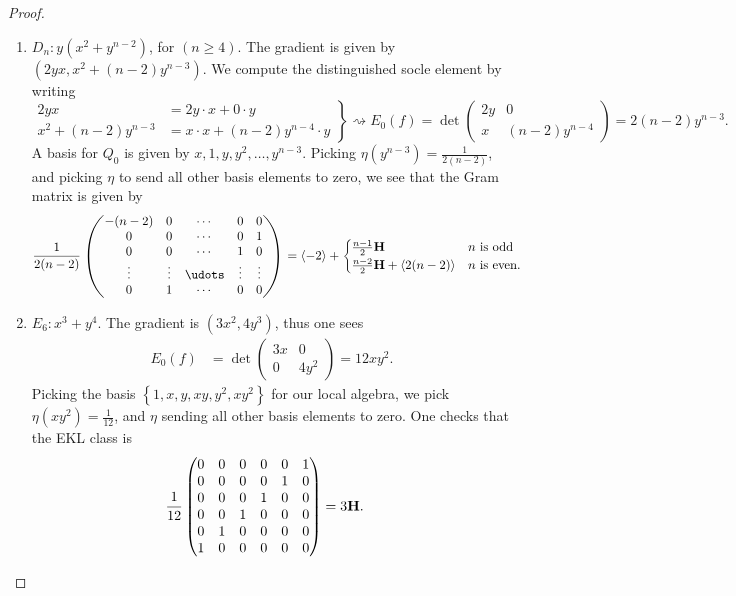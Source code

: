\documentclass[english]{article}
\begin{document}
\begin{proof}
\begin{enumerate}
    \item $D_n: y(x^2 + y^{n-2})$, for $(n\geq 4)$. The gradient is given by $(2yx, x^2 + (n-2)y^{n-3})$. We compute the distinguished socle element by writing
    \[ \left.\begin{aligned}
        2yx &= 2y \cdot x + 0\cdot y \\
        x^2 + (n-2)y^{n-3} &= x\cdot x + (n-2)y^{n-4}\cdot y
    \end{aligned} \right\}  \rightsquigarrow E_0(f) = \det \begin{pmatrix} 2y & 0 \\ x & (n-2)y^{n-4} \end{pmatrix}  = 2(n-2) y^{n-3}.
    \]    
    A basis for $Q_0$ is given by $x, 1, y, y^2, \ldots, y^{n-3}$. Picking $\eta(y^{n-3}) = \frac{1}{2(n-2)}$, and picking $\eta$ to send all other basis elements to zero, we see that the Gram matrix is given by
    \begin{align*}
        \frac{1}{2(n-2)}\begin{pmatrix} -(n-2) & 0 & \cdots & 0 & 0 \\
        0 & 0 & \cdots & 0 & 1 \\
        0 & 0 & \cdots & 1 & 0 \\
        \vdots & \vdots & \udots & \vdots & \vdots \\
        0 & 1 & \cdots & 0 & 0 \end{pmatrix} &= \left\langle -2 \right\rangle + \begin{cases} \frac{n-1}{2}\H & n\text{ is odd}\\ \frac{n-2}{2}\H + \left\langle 2(n-2) \right\rangle & n\text{ is even}. \end{cases}
    \end{align*}
    
    \item $E_6: x^3 + y^4$. The gradient is $(3x^2,4y^3)$, thus one sees
    \begin{align*}
        E_0(f) &= \det \begin{pmatrix} 3x & 0 \\ 0 & 4y^2 \end{pmatrix} = 12xy^2.
    \end{align*}
    Picking the basis $\left\{1,x,y, xy, y^2, xy^2\right\}$ for our local algebra, we pick $\eta(xy^2) = \frac{1}{12}$, and $\eta$ sending all other basis elements to zero. One checks that the EKL class is
    \begin{align*}
        \frac{1}{12} \begin{pmatrix}
        0 & 0 & 0 & 0 & 0 & 1 \\
        0 & 0 & 0 & 0 & 1 & 0 \\
        0 & 0 & 0 & 1 & 0  & 0 \\
        0 & 0 & 1 & 0 & 0  & 0 \\
        0 & 1 & 0 & 0 & 0  & 0 \\
        1 & 0 & 0 & 0 & 0  & 0 \end{pmatrix} &= 3\textbf{H}.
    \end{align*}
    


\end{enumerate}
\end{proof}
\end{document}

